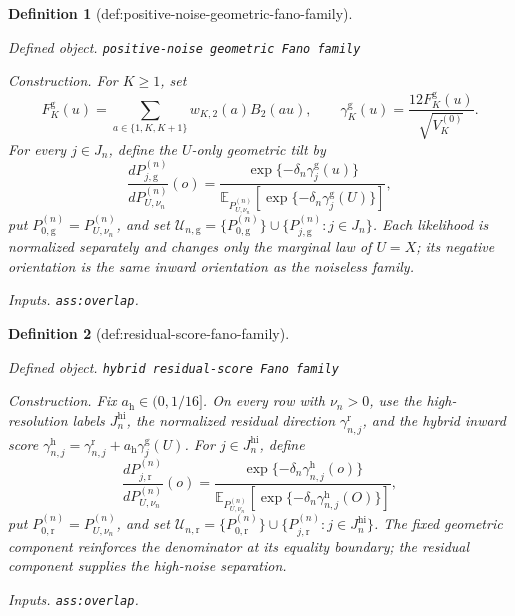 \documentclass{article}
\newtheorem{definition}{Definition}
\begin{document}
\begin{definition}[def:positive-noise-geometric-fano-family]\label{def:positive-noise-geometric-fano-family}
\par\smallskip\noindent\emph{Defined object.} \texttt{positive-\allowbreak{}noise geometric Fano family}
\par\smallskip\noindent\emph{Construction.} For \(K\geq1\), set
\[
 F^{\mathrm g}_K(u)=\sum_{a\in\{1,K,K+1\}}w_{K,2}(a)B_2(au),\qquad
 \gamma^{\mathrm g}_K(u)=\frac{12F^{\mathrm g}_K(u)}{\sqrt{V_K^{(0)}}}.
\]
For every \(j\in J_n\), define the \(U\)-only geometric tilt by
\[
 \frac{dP_{j,\mathrm g}^{(n)}}{dP_{U,\nu_n}^{(n)}}(o)
 =\frac{\exp\{-\delta_n\gamma^{\mathrm g}_j(u)\}}
 {\mathbb E_{P_{U,\nu_n}^{(n)}}[\exp\{-\delta_n\gamma^{\mathrm g}_j(U)\}]},
\]
put \(P_{0,\mathrm g}^{(n)}=P_{U,\nu_n}^{(n)}\), and set
\(\mathcal U_{n,\mathrm g}=\{P_{0,\mathrm g}^{(n)}\}\cup\{P_{j,\mathrm g}^{(n)}:j\in J_n\}\).  Each likelihood is normalized separately and changes only the marginal law of \(U=X\); its negative orientation is the same inward orientation as the noiseless family.
\par\smallskip\noindent\emph{Inputs.} \texttt{ass:\allowbreak{}overlap}.
\end{definition}

\begin{definition}[def:residual-score-fano-family]\label{def:residual-score-fano-family}
\par\smallskip\noindent\emph{Defined object.} \texttt{hybrid residual-\allowbreak{}score Fano family}
\par\smallskip\noindent\emph{Construction.} Fix \(a_{\mathrm h}\in(0,1/16]\).  On every row with \(\nu_n>0\), use the high-resolution labels \(J_n^{\mathrm{hi}}\), the normalized residual direction \(\gamma_{n,j}^{\mathrm r}\), and the hybrid inward score \(\gamma_{n,j}^{\mathrm h}=\gamma_{n,j}^{\mathrm r}+a_{\mathrm h}\gamma_j^{\mathrm g}(U)\).  For \(j\in J_n^{\mathrm{hi}}\), define
\[
 \frac{dP_{j,\mathrm r}^{(n)}}{dP_{U,\nu_n}^{(n)}}(o)
 =\frac{\exp\{-\delta_n\gamma_{n,j}^{\mathrm h}(o)\}}
 {\mathbb E_{P_{U,\nu_n}^{(n)}}[\exp\{-\delta_n\gamma_{n,j}^{\mathrm h}(O)\}]},
\]
put \(P_{0,\mathrm r}^{(n)}=P_{U,\nu_n}^{(n)}\), and set \(\mathcal U_{n,\mathrm r}=\{P_{0,\mathrm r}^{(n)}\}\cup\{P_{j,\mathrm r}^{(n)}:j\in J_n^{\mathrm{hi}}\}\).  The fixed geometric component reinforces the denominator at its equality boundary; the residual component supplies the high-noise separation.
\par\smallskip\noindent\emph{Inputs.} \texttt{ass:\allowbreak{}overlap}.
\end{definition}
\end{document}
